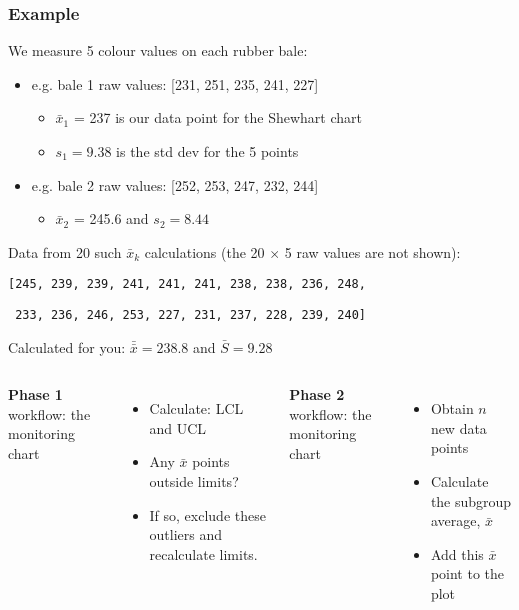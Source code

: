 \begin{frame}\frametitle{Example}

	We measure 5 colour values on each rubber bale:
	\begin{itemize}
		\item	e.g. bale 1 raw values: [231, 251, 235, 241, 227]
		\begin{itemize}
			\item	$\bar{x}_1$ = 237 is our data point for the Shewhart chart
			\item	$s_1 = 9.38$ is the std dev for the 5 points
		\end{itemize}
		\item	e.g. bale 2 raw values: [252, 253, 247, 232, 244]
		\begin{itemize}
			\item	$\bar{x}_2$ = 245.6 and $s_2 = 8.44$
		\end{itemize}
	\end{itemize}

	Data from 20 such $\bar{x}_k$ calculations {\footnotesize(the 20 $\times$ 5 raw values are not shown)}:


	\texttt{[245, 239, 239, 241, 241, 241, 238, 238, 236, 248, }

	\texttt{ 233, 236, 246, 253, 227, 231, 237, 228, 239, 240]}

	Calculated for you: $\bar{\bar{x}} = 238.8$ and $\bar{S} = 9.28$
	
	\myhrule
	\begin{columns}[t]
			\textbf{Phase 1} workflow: {} the monitoring chart
			\begin{itemize}
				\item	Calculate: LCL and UCL
				\item	Any $\bar{x}$ points outside limits?
				\item	If so, exclude these outliers and recalculate limits.
			\end{itemize}
			\textbf{Phase 2} workflow: {} the monitoring chart
			\begin{itemize}
				\item	Obtain $n$ new data points
				\item	Calculate the subgroup average, $\bar{x}$
				\item	Add this $\bar{x}$ point to the plot
			\end{itemize}
	\end{columns}

	
\end{frame}

